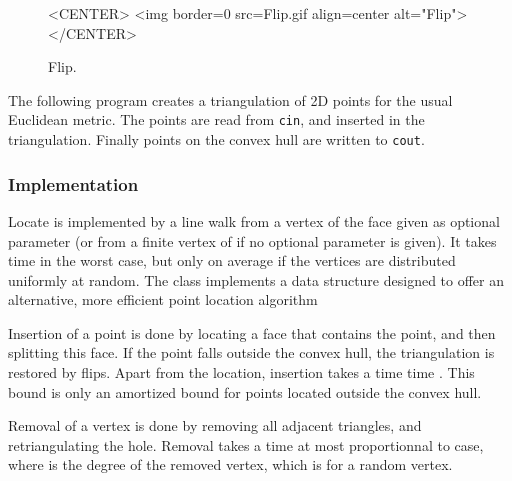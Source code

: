 \begin{figure}
\begin{ccTexOnly}
\begin{center} %

\end{center}
\end{ccTexOnly} 
\caption{Flip.
\label{I1_fig_flip_bis}}

\begin{ccHtmlOnly}
<CENTER>
<img border=0 src=Flip.gif align=center alt="Flip">
</CENTER>
\end{ccHtmlOnly} 
\end{figure}











\ccExample

The following program  creates a  triangulation of 2D points
for the  usual Euclidean metric. The points are read from {\tt cin},
and inserted in the triangulation.
Finally points on the convex hull are written to {\tt cout}. 


\subsubsection{Implementation}

Locate is implemented by a line walk from a vertex of the face given
as optional parameter (or from a finite vertex of
 if no optional parameter is given). It takes
time  in the worst case, but only 
on average if the vertices are distributed uniformly at random.
The class  
implements a data structure  designed to
offer an alternative, more efficient point location algorithm

Insertion of a point is done by locating a face that contains the
point, and then splitting this face.
If the point falls outside the convex hull, the triangulation
 is restored by flips.  Apart from the location, insertion takes a time 
time . This bound is only an amortized bound
for points located outside the convex hull.

Removal of a vertex is done by removing all adjacent triangles, and
retriangulating the hole. Removal takes a time  at most proportionnal to
 case, where
  is the degree of the removed vertex,
which is  for a random vertex.

